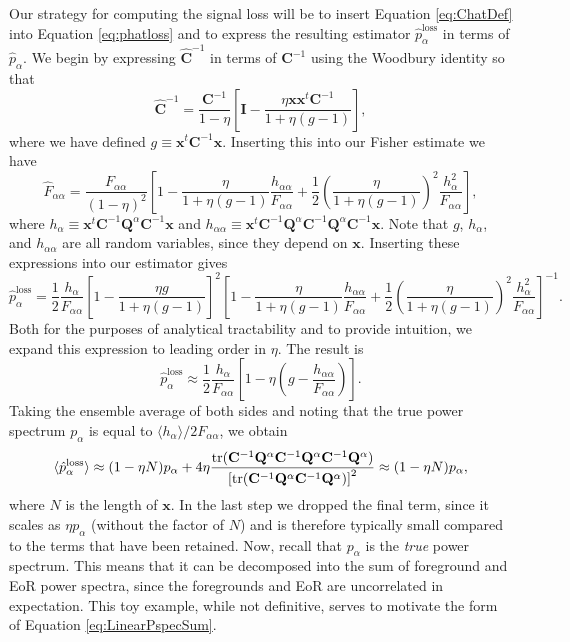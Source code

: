 \documentclass[preprint2,numberedappendix,tighten]{aastex6}  %
\newcommand{\x}{\mathbf{x}}
\newcommand{\C}{\mathbf{C}}
\newcommand{\Chat}{\mathbf{\hat{C}}}
\newcommand{\Q}{\mathbf{Q}}
\newcommand{\I}{\mathbf{I}}
\begin{document}
Our strategy for computing the signal loss will be to insert Equation \eqref{eq:ChatDef} into Equation \eqref{eq:phatloss} and to express the resulting estimator $\hat{p}_\alpha^\textrm{loss}$ in terms of $\hat{p}_\alpha$. We begin by expressing $\Chat^{-1}$ in terms of $\C^{-1}$ using the Woodbury identity so that
\begin{equation}
\Chat^{-1} = \frac{\C^{-1}}{1-\eta} \left[ \I - \frac{\eta \x \x^t \C^{-1}}{1+ \eta (g-1)}\right],
\end{equation}
where we have defined $g \equiv \x^t \C^{-1} \x$. Inserting this into our Fisher estimate we have
\begin{equation}
\hat{F}_{\alpha \alpha} = \frac{F_{\alpha \alpha}}{(1-\eta)^2} \left[ 1 -\frac{\eta }{1+ \eta (g-1)} \frac{h_{\alpha \alpha}}{F_{\alpha \alpha}} + \frac{1}{2} \left( \frac{\eta }{1+ \eta (g-1)} \right)^2 \frac{h_\alpha^2}{F_{\alpha \alpha}}\right],
\end{equation}
where $h_\alpha \equiv \x^t \C^{-1} \Q^\alpha \C^{-1} \x $ and $h_{\alpha \alpha} \equiv \x^t \C^{-1} \Q^\alpha \C^{-1} \Q^\alpha \C^{-1}\x $. Note that $g$, $h_\alpha$, and $h_{\alpha \alpha}$ are all random variables, since they depend on $\x$. Inserting these expressions into our estimator gives
\begin{equation}
\label{eq:phatlossexpanded}
\hat{p}_\alpha^\textrm{loss} = \frac{1}{2} \frac{h_\alpha}{F_{\alpha \alpha}} \left[ 1 - \frac{\eta g}{1+ \eta (g-1)}\right]^2  \left[ 1 -\frac{\eta }{1+ \eta (g-1)} \frac{h_{\alpha \alpha}}{F_{\alpha \alpha}} + \frac{1}{2} \left( \frac{\eta }{1+ \eta (g-1)} \right)^2 \frac{h_\alpha^2}{F_{\alpha \alpha}}\right]^{-1}.
\end{equation}
Both for the purposes of analytical tractability and to provide intuition, we expand this expression to leading order in $\eta$. The result is
\begin{equation}
\hat{p}_\alpha^\textrm{loss} \approx \frac{1}{2} \frac{h_\alpha}{F_{\alpha \alpha}} \left[ 1 - \eta \left( g - \frac{h_{\alpha \alpha}}{F_{\alpha \alpha}}\right)\right].
\end{equation}
Taking the ensemble average of both sides and noting that the true power spectrum $p_\alpha$ is equal to $\langle h_\alpha \rangle / 2 F_{\alpha \alpha}$, we obtain
\begin{equation}
\langle \hat{p}_\alpha^\textrm{loss} \rangle \approx (1- \eta N) p_\alpha + 4 \eta \frac{\rm{tr} (\C^{-1} \Q^\alpha \C^{-1} \Q^\alpha \C^{-1} \Q^\alpha )}{\left[ \rm{tr} (\C^{-1} \Q^\alpha \C^{-1} \Q^\alpha  ) \right]^2} \approx (1- \eta N) p_\alpha,
\end{equation}
where $N$ is the length of $\x$. In the last step we dropped the final term, since it scales as $\eta p_\alpha$ (without the factor of $N$) and is therefore typically small compared to the terms that have been retained. Now, recall that $p_\alpha$ is the \emph{true} power spectrum. This means that it can be decomposed into the sum of foreground and EoR power spectra, since the foregrounds and EoR are uncorrelated in expectation. This toy example, while not definitive, serves to motivate the form of Equation \eqref{eq:LinearPspecSum}.
\end{document}
